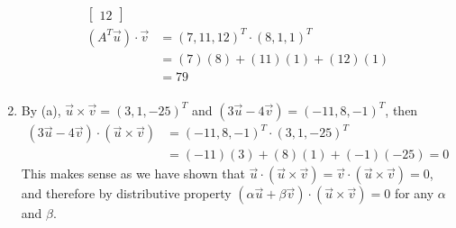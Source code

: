 \begin{Answer}
\begin{enumerate}[label=(\alph*)]
\begin{align*}
\begin{bmatrix}
12
\end{bmatrix} \\
(A^T\vec{u}) \cdot \vec{v}
&= (7, 11, 12)^T \cdot (8, 1, 1)^T \\
&= (7)(8) + (11)(1) + (12)(1) \\
&= 79 \\
\end{align*}
\item By (a), $\vec{u} \times \vec{v} = (3, 1, -25)^T$ and $(3\vec{u} - 4\vec{v}) = (-11,8,-1)^T$, then
\begin{align*}
(3\vec{u} - 4\vec{v}) \cdot (\vec{u} \times \vec{v}) &= (-11,8,-1)^T \cdot (3, 1, -25)^T \\
&= (-11)(3) + (8)(1) + (-1)(-25) = 0
\end{align*}
This makes sense as we have shown that $\vec{u} \cdot (\vec{u} \times \vec{v}) = \vec{v} \cdot (\vec{u} \times \vec{v}) = 0$, and therefore by distributive property $(\alpha\vec{u} + \beta\vec{v}) \cdot (\vec{u} \times \vec{v}) = 0$ for any $\alpha$ and $\beta$.
\end{enumerate}
\end{Answer}


